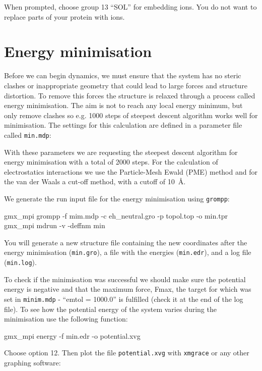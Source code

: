\documentclass[10pt]{article}
\begin{document}
When prompted, choose group 13 ``SOL'' for embedding ions. You do not want to replace parts of your protein with ions.


\section{Energy minimisation}

Before we can begin dynamics, we must ensure that the system has no steric clashes or inappropriate geometry that could lead to large forces and structure distortion. To remove this forces the structure is relaxed through a process called energy minimisation. The aim is not to reach any local energy minimum, but only remove clashes so e.g. 1000 steps of steepest descent algorithm works well for minimisation. The settings for this calculation are defined in a parameter file called \texttt{min.mdp}:
 
With these parameters we are requesting the steepest descent algorithm for energy minimisation with a total of 2000 steps. For the calculation of electrostatics interactions we use the Particle-Mesh Ewald (PME) method and for the van der Waals a cut-off method, with a cutoff of 10~\r{A}.

We generate the run input file for the energy minimisation using \texttt{grompp}:

\begin{cmdline}
gmx_mpi grompp -f mim.mdp -c eh_neutral.gro -p topol.top -o min.tpr
gmx_mpi mdrun -v -deffnm min
\end{cmdline}

You will generate a new structure file containing the new coordinates after the energy minimisation (\texttt{min.gro}), a file with the energies (\texttt{min.edr}), and a log file (\texttt{min.log}). 

To check if the minimisation was successful we should make sure the potential energy is negative and that the maximum force, Fmax, the target for which was set in \texttt{minim.mdp} - ``emtol = 1000.0'' is fulfilled (check it at the end of the log file). To see how the potential energy of the system varies during the minimisation use the following function:

\begin{cmdline}
gmx_mpi energy -f min.edr -o potential.xvg
\end{cmdline}

Choose option 12. Then plot the file \texttt{potential.xvg} with \texttt{xmgrace} or any other graphing software:
\end{document}
